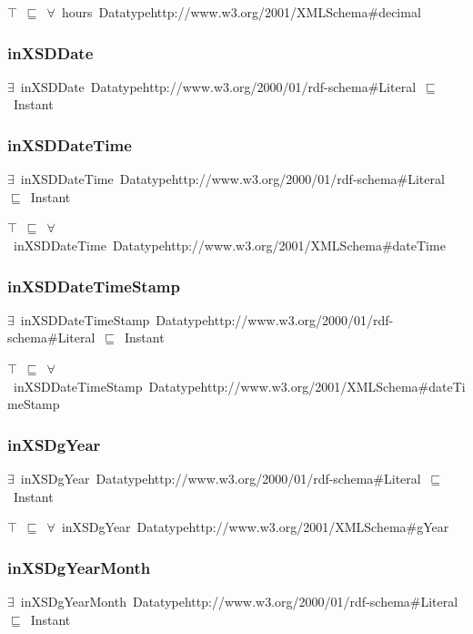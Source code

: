 \documentclass{article}
\begin{document}
\ensuremath{\top}~\ensuremath{\sqsubseteq}~\ensuremath{\forall}~hours~Datatypehttp://www.w3.org/2001/XMLSchema#decimal

\subsubsection*{inXSDDate}

\ensuremath{\exists}~inXSDDate~Datatypehttp://www.w3.org/2000/01/rdf-schema#Literal~\ensuremath{\sqsubseteq}~Instant

\subsubsection*{inXSDDateTime}

\ensuremath{\exists}~inXSDDateTime~Datatypehttp://www.w3.org/2000/01/rdf-schema#Literal~\ensuremath{\sqsubseteq}~Instant

\ensuremath{\top}~\ensuremath{\sqsubseteq}~\ensuremath{\forall}~inXSDDateTime~Datatypehttp://www.w3.org/2001/XMLSchema#dateTime

\subsubsection*{inXSDDateTimeStamp}

\ensuremath{\exists}~inXSDDateTimeStamp~Datatypehttp://www.w3.org/2000/01/rdf-schema#Literal~\ensuremath{\sqsubseteq}~Instant

\ensuremath{\top}~\ensuremath{\sqsubseteq}~\ensuremath{\forall}~inXSDDateTimeStamp~Datatypehttp://www.w3.org/2001/XMLSchema#dateTimeStamp

\subsubsection*{inXSDgYear}

\ensuremath{\exists}~inXSDgYear~Datatypehttp://www.w3.org/2000/01/rdf-schema#Literal~\ensuremath{\sqsubseteq}~Instant

\ensuremath{\top}~\ensuremath{\sqsubseteq}~\ensuremath{\forall}~inXSDgYear~Datatypehttp://www.w3.org/2001/XMLSchema#gYear

\subsubsection*{inXSDgYearMonth}

\ensuremath{\exists}~inXSDgYearMonth~Datatypehttp://www.w3.org/2000/01/rdf-schema#Literal~\ensuremath{\sqsubseteq}~Instant
\end{document}
